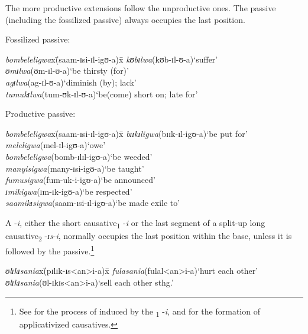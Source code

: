 \largerpage
The more productive extensions follow the unproductive ones. The passive (including the fossilized passive) always occupies the last position.
\begin{exe}
\ex \begin{xlist}
\ex Fossilized passive:
\begin{tabbing}
\textit{bombeleligwa}x\=(\degree saam-ɪsi-ɪl-igʊ-a)x\=\kill
\textit{kʊbɪlwa}\>(\degree kʊb-ɪl-ʊ-a)\>`suffer'\\
\textit{ʊmɪlwa}\>(\degree ʊm-ɪl-ʊ-a)\>`be thirsty (for)'\\
\textit{agɪlwa}\>(\degree ag-ɪl-ʊ-a)\>`diminish (by); lack'\\
\textit{tumukɪlwa}\>(\degree tum-ʊk-ɪl-ʊ-a)\>`be(come) short on; late for'
\end{tabbing}
 \ex Productive passive:
\begin{tabbing}
	\textit{bombeleligwa}x\=(\degree saam-ɪsi-ɪl-igʊ-a)x\=\kill
	\textit{bɪɪkɪligwa}\>(\degree bɪɪk-ɪl-igʊ-a)\>`be put for'\\
	\textit{meleligwa}\>(\degree mel-ɪl-igʊ-a)\>`owe'\\
	\textit{bombeleligwa}\>(\degree bomb-ɪlɪl-igʊ-a)\>`be weeded'\\
	\textit{manyisigwa}\>(\degree many-ɪsi-igʊ-a)\>`be taught'\\
	\textit{fumusigwa}\>(\degree fum-uk-i-igʊ-a)\>`be announced'\\
	\textit{ɪmikigwa}\>(\degree ɪm-ɪk-igʊ-a)\>`be respected'\\
	\textit{saamikɪsigwa}\>(\degree saam-ɪsi-ɪl-igʊ-a)\>\lq be made exile to'
\end{tabbing}
\end{xlist}
\end{exe}

A  -\textit{i}, either the short causative\textsubscript{1} \mbox{-\textit{i}} or the last segment of a split-up long causative\textsubscript{2} \mbox{-\textit{ɪs}-\textit{i}}, normally occupies the last position within the base, unless it is followed by the passive.\footnote{See  for the process of  induced by the \textsubscript{1} -\textit{i}, and  for the formation of applicativized causatives.}
\begin{exe}
\ex\begin{xlist}
\begin{tabbing}
\textit{ʊlɪkɪsania}x\=(\degree pɪlɪk-ɪs<an>i-a)x\=\kill%
\textit{fulasania}\>(\degree fulal<an>i-a)\>`hurt each other'\\
\textit{ʊlɪkɪsania}\>(\degree ʊl-ɪkɪs<an>i-a)\>\lq sell each other sthg.'
\end{tabbing}
\end{xlist}
\end{exe}

